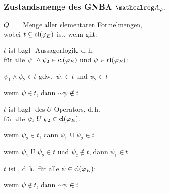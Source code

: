 \begin{frame}
    \end{frame}

    \begin{frame}
      \frametitle{Zustandsmenge des GNBA $\Aut{A}_{\varphi_E}$}

      $Q$ $=$ Menge aller elementaren Formelmengen, \\
      wobei $t \subseteq \textup{cl}(\varphi_E)$  ist, wenn gilt:
      \par\medskip
      \begin{Enumerate}
        \item
          $t$ ist  bzgl.\ Aussagenlogik, d.\,h.\\
          für alle $\psi_1 \land \psi_2 \in \textup{cl}(\varphi_E)$ und $\psi \in \textup{cl}(\varphi_E)$:
          \begin{Itemize}
            \item
              $\psi_1 \land \psi_2 \in t$ gdw.\
              $\psi_1 \in t$ und $\psi_2 \in t$
            \item
              wenn $\psi \in t$, dann $\mathord{\sim}\psi \notin t$
          \end{Itemize}
          \par\medskip
        \item<2->
          $t$ ist  bzgl.\ des $U$-Operators, d.\,h.\\
          für alle $\psi_1 \mathbin{U} \psi_2 \in \textup{cl}(\varphi_E)$:
          \begin{Itemize}
            \item
              wenn $\psi_2 \in t$, dann $\psi_1 \mathbin{U} \psi_2 \in t$
            \item
              wenn $\psi_1 \mathbin{U} \psi_2 \in t$ und $\psi_2 \notin t$,
              dann $\psi_1 \in t$
          \end{Itemize}
          \par\medskip
        \item<3->
          $t$ ist , d.\,h.\ für alle $\psi \in \textup{cl}(\varphi_E)$:
          \begin{Itemize}
            \item[]
              wenn $\psi \notin t$, dann $\mathord{\sim}\psi \in t$
          \end{Itemize}
      \end{Enumerate}


\end{frame}
